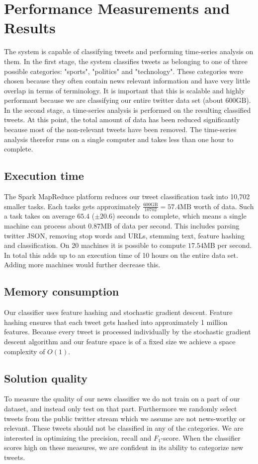 \documentclass{llncs}
\begin{document}
\section{Performance Measurements and Results}
The system is capable of classifying tweets and performing time-series analysis on them. In the first stage, the system classifies tweets as belonging to one of three possible categories: "sports", "politics" and "technology". These categories were chosen because they often contain news relevant information and have very little overlap in terms of terminology. It is important that this is scalable and highly performant because we are classifying our entire twitter data set (about $600\text{GB}$). In the second stage, a time-series analysis is performed on the resulting classified tweets. At this point, the total amount of data has been reduced significantly because most of the non-relevant tweets have been removed. The time-series analysis therefor runs on a single computer and takes less than one hour to complete.

\subsection{Execution time}
The Spark MapReduce platform reduces our tweet classification task into 10,702 smaller tasks. Each tasks gets approximately $\frac{600\text{GB}}{10702} = 57.4\text{MB}$ worth of data. Such a task takes on average $65.4$ ($\pm 20.6$) seconds to complete, which means a single machine can process about $0.87\text{MB}$ of data per second. This includes parsing twitter JSON, removing stop words and URLs, stemming text, feature hashing and classification. On 20 machines it is possible to compute $17.54\text{MB}$ per second. In total this adds up to an execution time of 10 hours on the entire data set. Adding more machines would further decrease this.

\subsection{Memory consumption}
Our classifier uses feature hashing and stochastic gradient descent. Feature hashing ensures that each tweet gets hashed into approximately 1 million features. Because every tweet is processed individually by the stochastic gradient descent algorithm and our feature space is of a fixed size we achieve a space complexity of $O(1)$.

\subsection{Solution quality}
To measure the quality of our news classifier we do not train on a part of our dataset, and instead only test on that part. Furthermore we randomly select tweets from the public twitter stream which we assume are not news-worthy or relevant. These tweets should not be classified in any of the categories. We are interested in optimizing the precision, recall and $F_1$-score. When the classifier scores high on these measures, we are confident in its ability to categorize new tweets.
\end{document}
